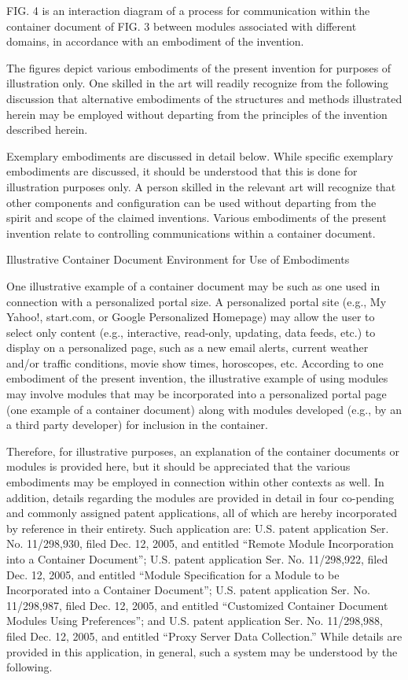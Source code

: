 FIG. 4 is an
interaction diagram of a process for communication within the
container document of FIG. 3 between modules associated with different
domains, in accordance with an embodiment of the invention.

The figures depict various embodiments of the
present invention for purposes of illustration only. One skilled in
the art will readily recognize from the following discussion that
alternative embodiments of the structures and methods illustrated
herein may be employed without departing from the principles of the
invention described herein.

\description

Exemplary embodiments are discussed in detail below. While
specific exemplary embodiments are discussed, it should be understood
that this is done for illustration purposes only. A person skilled in
the relevant art will recognize that other components and
configuration can be used without departing from the spirit and scope
of the claimed inventions. Various embodiments of the present
invention relate to controlling communications within a container
document.

Illustrative Container Document Environment for Use of Embodiments

One illustrative example of a
container document may be such as one used in connection with a
personalized portal size. A personalized portal site (e.g., My Yahoo!,
start.com, or Google Personalized Homepage) may allow the user to
select only content (e.g., interactive, read-only, updating, data
feeds, etc.) to display on a personalized page, such as a new email
alerts, current weather and/or traffic conditions, movie show times,
horoscopes, etc. According to one embodiment of the present invention,
the illustrative example of using modules may involve modules that may
be incorporated into a personalized portal page (one example of a
container document) along with modules developed (e.g., by an a third
party developer) for inclusion in the container.

Therefore, for illustrative purposes, an explanation of the
container documents or modules is provided here, but it should be
appreciated that the various embodiments may be employed in connection
within other contexts as well. In addition, details regarding the
modules are provided in detail in four co-pending and commonly
assigned patent applications, all of which are hereby incorporated by
reference in their entirety. Such application are: U.S. patent
application Ser. No. 11/298,930, filed Dec. 12, 2005, and entitled
``Remote Module Incorporation into a Container Document'';
U.S. patent application Ser. No. 11/298,922, filed Dec. 12, 2005, and
entitled ``Module Specification for a Module to be Incorporated
into a Container Document''; U.S. patent application
Ser. No. 11/298,987, filed Dec. 12, 2005, and entitled
``Customized Container Document Modules Using
Preferences''; and U.S. patent application Ser. No. 11/298,988,
filed Dec. 12, 2005, and entitled ``Proxy Server Data
Collection.'' While details are provided in this application, in
general, such a system may be understood by the following.


